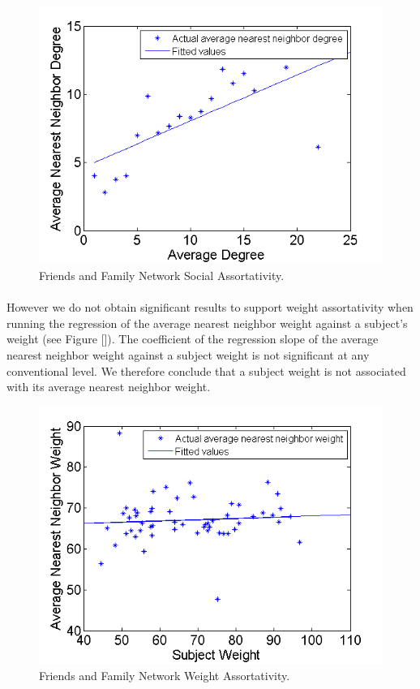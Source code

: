 \documentclass[11pt]{article}
\begin{document}
\begin{figure}[!ht]
\center
   \includegraphics[scale=0.72]{social_assortativity_figure2.png}
   \caption{\label{2} Friends and Family Network Social Assortativity.}
\end{figure}

\paragraph{}
However we do not obtain significant results to support weight assortativity when running the regression of the average nearest neighbor weight against a subject's weight (see Figure []). The coefficient of the regression slope of the average nearest neighbor weight against a subject weight is not significant at any conventional level. We therefore conclude that a subject weight is not associated with its average nearest neighbor weight. 

\begin{figure}[!ht]
\center
   \includegraphics[scale=0.72]{weight_assortativity_figure3.png}
   \caption{\label{3} Friends and Family Network Weight Assortativity.}
\end{figure}
\end{document}
